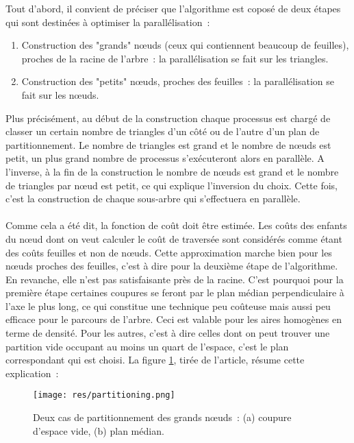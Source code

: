 \documentclass[a4paper]{article}
\begin{document}
Tout d'abord, il convient de préciser que l'algorithme est coposé de deux étapes qui sont destinées à optimiser la parallélisation~:
\begin{enumerate}
	\item Construction des "grands" nœuds (ceux qui contiennent beaucoup de feuilles), proches de la racine de l'arbre~: la parallélisation se fait sur les triangles.
	\item Construction des "petits" nœuds, proches des feuilles~: la parallélisation se fait sur les nœuds.
\end{enumerate}
Plus précisément, au début de la construction chaque processus est chargé de classer un certain nombre de triangles d'un côté ou de l'autre d'un plan de partitionnement. Le nombre de triangles est grand et le nombre de nœuds est petit, un plus grand nombre de processus s’exécuteront alors en parallèle. A l'inverse, à la fin de la construction le nombre de nœuds est grand et le nombre de triangles par nœud est petit, ce qui explique l'inversion du choix. Cette fois, c'est la construction de chaque sous-arbre qui s'effectuera en parallèle.
\\\\
Comme cela a été dit, la fonction de coût doit être estimée. Les coûts des enfants du nœud dont on veut calculer le coût de traversée sont considérés comme étant des coûts feuilles et non de nœuds.
Cette approximation marche bien pour les nœuds proches des feuilles, c'est à dire pour la deuxième étape de l'algorithme. En revanche, elle n'est pas satisfaisante près de la racine. C'est pourquoi pour la première étape certaines coupures se feront par le plan médian perpendiculaire à l'axe le plus long, ce qui constitue une technique peu coûteuse mais aussi peu efficace pour le parcours de l'arbre. Ceci est valable pour les aires homogènes en terme de densité. Pour les autres, c'est à dire celles dont on peut trouver une partition vide occupant au moins un quart de l'espace, c'est le plan correspondant qui est choisi. La figure \ref{fig:partition}, tirée de l'article, résume cette explication~:

\begin{figure}[!h]
\centering
\texttt{[image: res/partitioning.png]}
\caption{\label{fig:partition}Deux cas de partitionnement des grands nœuds~: (a) coupure d'espace vide, (b) plan médian.}
\end{figure}

\end{document}
